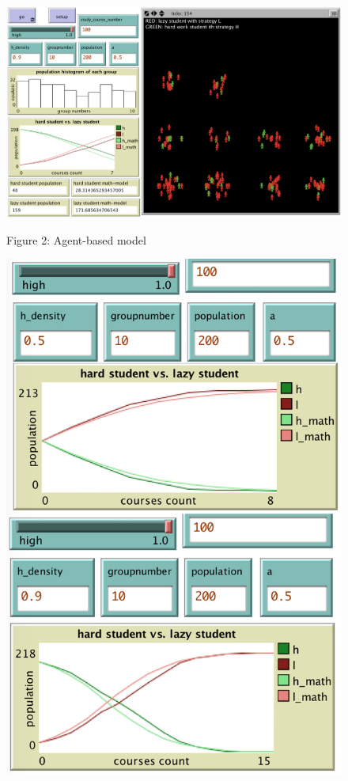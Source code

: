 \documentclass[a4paper, 12pt]{article}
\begin{document}
\begin{figure}[!h]
\centering
	\begin{minipage}[t]{0.6\textwidth}
		\centering
		\includegraphics[width=1\linewidth]{./figures/agent}
		\begin{small}
			\centering
			\textsf{\footnotesize Figure 2: Agent-based model}
		\end{small}
		\label{fig1}
	\end{minipage}
	\begin{minipage}[t]{0.25\textwidth}
		\centering
		\includegraphics[width=1\linewidth]{./figures/agent-comp}

\end{minipage}
\end{figure}
\end{document}
